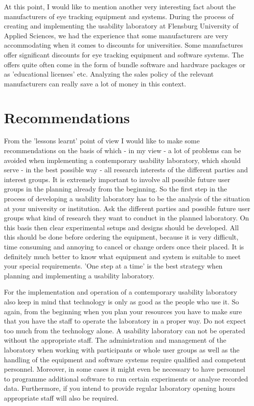 \begin{
}[h]
\begin{styleBodyTextIndent}
At this point, I would like to mention another very interesting fact about the manufacturers of eye tracking equipment and systems. During the process of creating and implementing the usability laboratory at Flensburg University of Applied Sciences, we had the experience that some manufacturers are very accommodating when it comes to discounts for universities. Some manufactures offer significant discounts for eye tracking equipment and software systems. The offers quite often come in the form of bundle software and hardware packages or as 'educational licenses' etc. Analyzing the sales policy of the relevant manufacturers can really save a lot of money in this context.
\end{styleBodyTextIndent}

\section{Recommendations}

From the 'lessons learnt' point of view I would like to make some recommendations on the basis of which - in my view - a lot of problems can be avoided when implementing a contemporary usability laboratory, which should serve - in the best possible way - all research interests of the different parties and interest groups. It is extremely important to involve all possible future user groups in the planning already from the beginning. So the first step in the process of developing a usability laboratory has to be the analysis of the situation at your university or institution. Ask the different parties and possible future user groups what kind of research they want to conduct in the planned laboratory. On this basis then clear experimental setups and designs should be developed. All this should be done before ordering the equipment, because it is very difficult, time consuming and annoying to cancel or change orders once their placed. It is definitely much better to know what equipment and system is suitable to meet your special requirements. 'One step at a time' is the best strategy when planning and implementing a usability laboratory.

\begin{styleBodyTextIndent}
For the implementation and operation of a contemporary usability laboratory also keep in mind that technology is only as good as the people who use it. So again, from the beginning when you plan your resources you have to make sure that you have the staff to operate the laboratory in a proper way. Do not expect too much from the technology alone. A usability laboratory can not be operated without the appropriate staff. The administration and management of the laboratory when working with participants or whole user groups as well as the handling of the equipment and software systems require qualified and competent personnel. Moreover, in some cases it might even be necessary to have personnel to programme additional software to run certain experiments or analyse recorded data. Furthermore, if you intend to provide regular laboratory opening hours appropriate staff will also be required. 
\end{styleBodyTextIndent}


\end{
}
